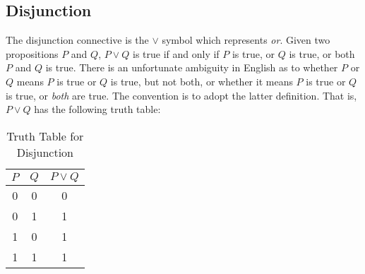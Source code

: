     \subsection{Disjunction}
        The disjunction connective is the $\lor$ symbol which represents
        \textit{or}. Given two propositions $P$ and $Q$, $P\lor{Q}$ is true if
        and only if $P$ is true, or $Q$ is true, or both $P$ and $Q$ is true.
        There is an unfortunate ambiguity in English as to whether $P$ or $Q$
        means $P$ is true or $Q$ is true, but not both, or whether it means
        $P$ is true or $Q$ is true, or \textit{both} are true. The convention is
        to adopt the latter definition. That is, $P\lor{Q}$ has the following
        truth table:
        \begin{table}[H]
            \centering
            \captionsetup{type=table}
            \begin{tabular}{ccc}
                $P$&$Q$&$P\lor{Q}$\\
                \hline
                0&0&0\\
                0&1&1\\
                1&0&1\\
                1&1&1
            \end{tabular}
            \caption{Truth Table for Disjunction}
            \label{tab:Truth_Table_for_Disjunction}
        \end{table}
